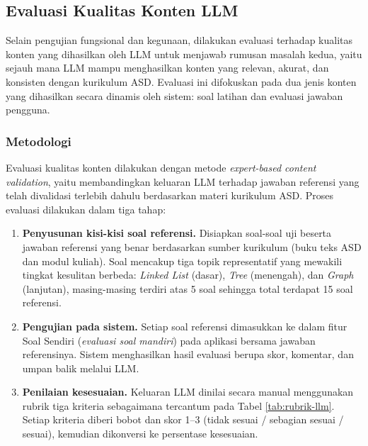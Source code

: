 \subsection{Evaluasi Kualitas Konten LLM}

Selain pengujian fungsional dan kegunaan, dilakukan evaluasi terhadap kualitas konten yang dihasilkan oleh LLM untuk menjawab rumusan masalah kedua, yaitu sejauh mana LLM mampu menghasilkan konten yang relevan, akurat, dan konsisten dengan kurikulum ASD. Evaluasi ini difokuskan pada dua jenis konten yang dihasilkan secara dinamis oleh sistem: soal latihan dan evaluasi jawaban pengguna.

\subsubsection{Metodologi}

Evaluasi kualitas konten dilakukan dengan metode \textit{expert-based content validation}, yaitu membandingkan keluaran LLM terhadap jawaban referensi yang telah divalidasi terlebih dahulu berdasarkan materi kurikulum ASD. Proses evaluasi dilakukan dalam tiga tahap:

\begin{enumerate}
    \item \textbf{Penyusunan kisi-kisi soal referensi.} Disiapkan soal-soal uji beserta jawaban referensi yang benar berdasarkan sumber kurikulum (buku teks ASD dan modul kuliah). Soal mencakup tiga topik representatif yang mewakili tingkat kesulitan berbeda: \textit{Linked List} (dasar), \textit{Tree} (menengah), dan \textit{Graph} (lanjutan), masing-masing terdiri atas 5 soal sehingga total terdapat 15 soal referensi.

    \item \textbf{Pengujian pada sistem.} Setiap soal referensi dimasukkan ke dalam fitur Soal Sendiri (\textit{evaluasi soal mandiri}) pada aplikasi bersama jawaban referensinya. Sistem menghasilkan hasil evaluasi berupa skor, komentar, dan umpan balik melalui LLM.

    \item \textbf{Penilaian kesesuaian.} Keluaran LLM dinilai secara manual menggunakan rubrik tiga kriteria sebagaimana tercantum pada Tabel \ref{tab:rubrik-llm}. Setiap kriteria diberi bobot dan skor 1–3 (tidak sesuai / sebagian sesuai / sesuai), kemudian dikonversi ke persentase kesesuaian.
\end{enumerate}


